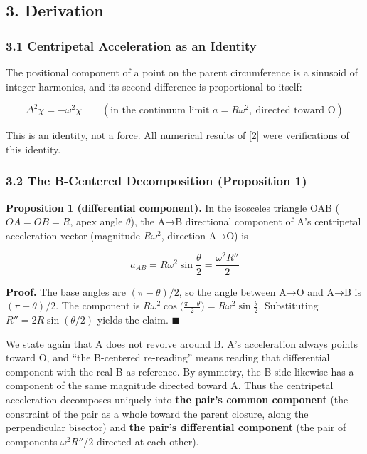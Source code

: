 \documentclass[
  a4paper,
]{article}
\begin{document}
\subsection{3. Derivation}\label{derivation}

\subsubsection{3.1 Centripetal Acceleration as an
Identity}\label{centripetal-acceleration-as-an-identity}

The positional component of a point on the parent circumference is a
sinusoid of integer harmonics, and its second difference is proportional
to itself:

\[
\Delta^2\chi=-\omega^2\chi\qquad(\text{in the continuum limit }a=R\omega^2,\ \text{directed toward O})
\]

This is an identity, not a force. All numerical results of {[}2{]} were
verifications of this identity.

\subsubsection{3.2 The B-Centered Decomposition (Proposition
1)}\label{the-b-centered-decomposition-proposition-1}

\textbf{Proposition 1 (differential component).} In the isosceles
triangle OAB (\(OA=OB=R\), apex angle \(\theta\)), the A→B directional
component of A's centripetal acceleration vector (magnitude
\(R\omega^2\), direction A→O) is

\[
a_{AB}=R\omega^2\sin\frac{\theta}{2}=\frac{\omega^2 R''}{2}
\]

\textbf{Proof.} The base angles are \((\pi-\theta)/2\), so the angle
between A→O and A→B is \((\pi-\theta)/2\). The component is
\(R\omega^2\cos\!\big(\tfrac{\pi-\theta}{2}\big)=R\omega^2\sin\tfrac{\theta}{2}\).
Substituting \(R''=2R\sin(\theta/2)\) yields the claim. \(\blacksquare\)

We state again that A does not revolve around B. A's acceleration always
points toward O, and ``the B-centered re-reading'' means reading that
differential component with the real B as reference. By symmetry, the B
side likewise has a component of the same magnitude directed toward A.
Thus the centripetal acceleration decomposes uniquely into \textbf{the
pair's common component} (the constraint of the pair as a whole toward
the parent closure, along the perpendicular bisector) and \textbf{the
pair's differential component} (the pair of components \(\omega^2R''/2\)
directed at each other).
\end{document}
